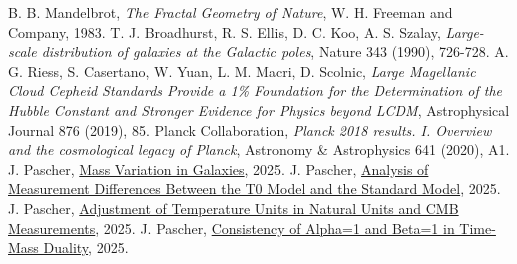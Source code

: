\documentclass[12pt,a4paper]{article}
\begin{document}
\begin{thebibliography}{99}
			 B. B. Mandelbrot, \textit{The Fractal Geometry of Nature}, W. H. Freeman and Company, 1983.
			 T. J. Broadhurst, R. S. Ellis, D. C. Koo, A. S. Szalay, \textit{Large-scale distribution of galaxies at the Galactic poles}, Nature 343 (1990), 726-728.
			 A. G. Riess, S. Casertano, W. Yuan, L. M. Macri, D. Scolnic, \textit{Large Magellanic Cloud Cepheid Standards Provide a 1\% Foundation for the Determination of the Hubble Constant and Stronger Evidence for Physics beyond LCDM}, Astrophysical Journal 876 (2019), 85.
			 Planck Collaboration, \textit{Planck 2018 results. I. Overview and the cosmological legacy of Planck}, Astronomy \& Astrophysics 641 (2020), A1.
			 J. Pascher, \href{https://github.com/jpascher/T0-Time-Mass-Duality/blob/main/2/pdf/English/MassVarGalaxienEn.pdf}{Mass Variation in Galaxies}, 2025.
			 J. Pascher, \href{https://github.com/jpascher/T0-Time-Mass-Duality/blob/main/2/pdf/English/MessdifferenzenT0StandardEn.pdf}{Analysis of Measurement Differences Between the T0 Model and the Standard Model}, 2025.
			 J. Pascher, \href{https://github.com/jpascher/T0-Time-Mass-Duality/blob/main/2/pdf/English/TempEinheitenCMBEn.pdf}{Adjustment of Temperature Units in Natural Units and CMB Measurements}, 2025.
			 J. Pascher, \href{https://github.com/jpascher/T0-Time-Mass-Duality/blob/main/2/pdf/English/Alpha1Beta1KonsistenzEn.pdf}{Consistency of Alpha=1 and Beta=1 in Time-Mass Duality}, 2025.
		\end{thebibliography}
		
	
\end{document}
